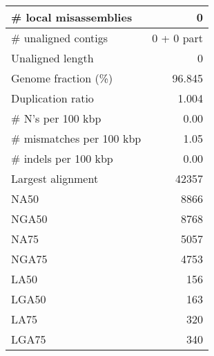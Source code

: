 \documentclass[12pt,a4paper]{article}
\begin{document}
\begin{table}[ht]
\begin{center}
\begin{tabular}{|l*{1}{|r}|}
\# local misassemblies & 0 \\ \hline
\# unaligned contigs & 0 + 0 part \\ \hline
Unaligned length & 0 \\ \hline
Genome fraction (\%) & 96.845 \\ \hline
Duplication ratio & 1.004 \\ \hline
\# N's per 100 kbp & 0.00 \\ \hline
\# mismatches per 100 kbp & 1.05 \\ \hline
\# indels per 100 kbp & 0.00 \\ \hline
Largest alignment & 42357 \\ \hline
NA50 & 8866 \\ \hline
NGA50 & 8768 \\ \hline
NA75 & 5057 \\ \hline
NGA75 & 4753 \\ \hline
LA50 & 156 \\ \hline
LGA50 & 163 \\ \hline
LA75 & 320 \\ \hline
LGA75 & 340 \\ \hline
\end{tabular}
\end{center}
\end{table}
\end{document}
